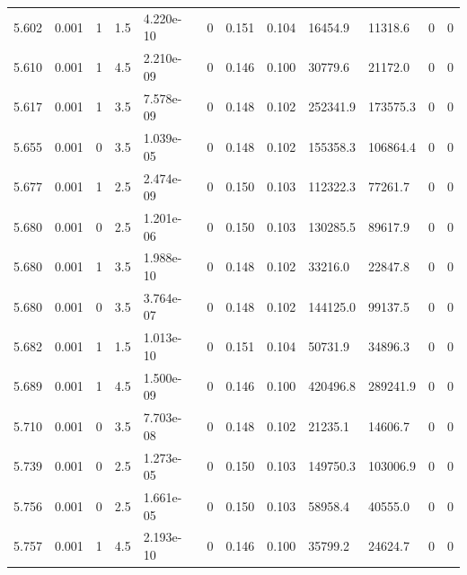 \documentclass[preview]{standalone}
\begin{document}
{{{{{{{{{{{{{\begin{tabular}{L{1.2cm}C{1.2cm} C{0.3cm}C{0.5cm} C{1.4cm}C{1.4cm} C{1.4cm}C{1.4cm} C{1.6cm}C{1.6cm} C{1.6cm}C{1.6cm}}
  5.602  &  0.001  & 1     & 1.5 &  4.220e-10  & 0  &  0.151&   0.104& 16454.9 & 11318.6   &  0 & 0  \\ 
  5.610  &  0.001  & 1     & 4.5 &  2.210e-09  & 0  &  0.146&   0.100& 30779.6 & 21172.0   &  0 & 0  \\ 
  5.617  &  0.001  & 1     & 3.5 &  7.578e-09  & 0  &  0.148&   0.102& 252341.9 & 173575.3   &  0 & 0  \\ 
  5.655  &  0.001  & 0     & 3.5 &  1.039e-05  & 0  &  0.148&   0.102& 155358.3 & 106864.4   &  0 & 0  \\ 
  5.677  &  0.001  & 1     & 2.5 &  2.474e-09  & 0  &  0.150&   0.103& 112322.3 & 77261.7   &  0 & 0  \\ 
  5.680  &  0.001  & 0     & 2.5 &  1.201e-06  & 0  &  0.150&   0.103& 130285.5 & 89617.9   &  0 & 0  \\ 
  5.680  &  0.001  & 1     & 3.5 &  1.988e-10  & 0  &  0.148&   0.102& 33216.0 & 22847.8   &  0 & 0  \\ 
  5.680  &  0.001  & 0     & 3.5 &  3.764e-07  & 0  &  0.148&   0.102& 144125.0 & 99137.5   &  0 & 0  \\ 
  5.682  &  0.001  & 1     & 1.5 &  1.013e-10  & 0  &  0.151&   0.104& 50731.9 & 34896.3   &  0 & 0  \\ 
  5.689  &  0.001  & 1     & 4.5 &  1.500e-09  & 0  &  0.146&   0.100& 420496.8 & 289241.9   &  0 & 0  \\ 
  5.710  &  0.001  & 0     & 3.5 &  7.703e-08  & 0  &  0.148&   0.102& 21235.1 & 14606.7   &  0 & 0  \\ 
  5.739  &  0.001  & 0     & 2.5 &  1.273e-05  & 0  &  0.150&   0.103& 149750.3 & 103006.9   &  0 & 0  \\ 
  5.756  &  0.001  & 0     & 2.5 &  1.661e-05  & 0  &  0.150&   0.103& 58958.4 & 40555.0   &  0 & 0  \\ 
  5.757  &  0.001  & 1     & 4.5 &  2.193e-10  & 0  &  0.146&   0.100& 35799.2 & 24624.7   &  0 & 0  \\ 
\hline 
\end{tabular} 

}}}}}}}}}}}}}
\end{document}

